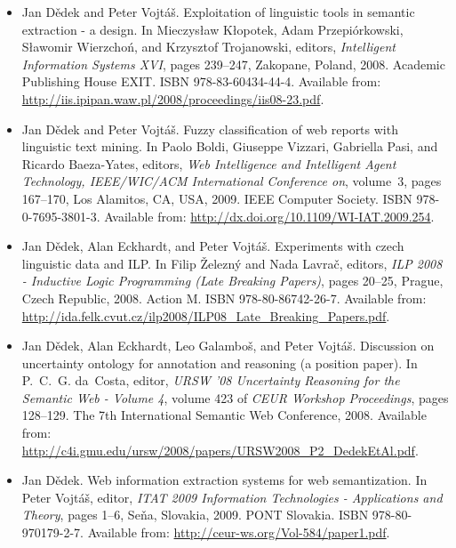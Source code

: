 \documentclass[12pt,a4paper,twoside,notitlepage]{article}
\begin{document}
\begin{itemize}
\item
Jan D{\v{e}}dek and Peter Vojt{\'{a}}{\v{s}}.
\newblock Exploitation of linguistic tools in semantic extraction - a design.
\newblock In Mieczys{{\l}}aw K{{\l}}opotek, Adam Przepi{\'{o}}rkowski,
  S{{\l}}awomir Wierzcho{\'{n}}, and Krzysztof Trojanowski, editors, {\em
  Intelligent Information Systems {XVI}}, pages 239--247, Zakopane, Poland,
  2008. Academic Publishing House {EXIT}.
\newblock ISBN 978-83-60434-44-4.
\newblock Available from:
  \url{http://iis.ipipan.waw.pl/2008/proceedings/iis08-23.pdf}.


\item
Jan D{\v{e}}dek and Peter Vojt{\'{a}}{\v{s}}.
\newblock Fuzzy classification of web reports with linguistic text mining.
\newblock In Paolo Boldi, Giuseppe Vizzari, Gabriella Pasi, and Ricardo
  Baeza-Yates, editors, {\em Web Intelligence and Intelligent Agent Technology,
  IEEE/WIC/ACM International Conference on}, volume~3, pages 167--170, Los
  Alamitos, CA, USA, 2009. IEEE Computer Society.
\newblock ISBN 978-0-7695-3801-3.
\newblock Available from: \url{http://dx.doi.org/10.1109/WI-IAT.2009.254}.


\item
Jan D{\v{e}}dek, Alan Eckhardt, and Peter Vojt{\'{a}}{\v{s}}.
\newblock Experiments with czech linguistic data and {ILP}.
\newblock In Filip {\v{Z}}elezn{\'{y}} and Nada Lavra{\v{c}}, editors, {\em
  {ILP} 2008 - Inductive Logic Programming (Late Breaking Papers)}, pages
  20--25, Prague, Czech Republic, 2008. Action M.
\newblock ISBN 978-80-86742-26-7.
\newblock Available from:
  \url{http://ida.felk.cvut.cz/ilp2008/ILP08_Late_Breaking_Papers.pdf}.




\item
Jan D{\v{e}}dek, Alan Eckhardt, Leo Galambo{\v{s}}, and Peter
  Vojt{\'{a}}{\v{s}}.
\newblock Discussion on uncertainty ontology for annotation and reasoning (a
  position paper).
\newblock In P.~C.~G. da~Costa, editor, {\em {URSW} '08 Uncertainty Reasoning
  for the Semantic Web - Volume 4}, volume 423 of {\em {CEUR} Workshop
  Proceedings}, pages 128--129. The 7th International Semantic Web Conference,
  2008.
\newblock Available from:
  \url{http://c4i.gmu.edu/ursw/2008/papers/URSW2008_P2_DedekEtAl.pdf}.


\item
Jan D{\v{e}}dek.
\newblock Web information extraction systems for web semantization.
\newblock In Peter Vojt{\'{a}}{\v{s}}, editor, {\em {ITAT} 2009 Information
  Technologies - Applications and Theory}, pages 1--6, Se{\v{n}}a, Slovakia,
  2009. {PONT} Slovakia.
\newblock ISBN 978-80-970179-2-7.
\newblock Available from: \url{http://ceur-ws.org/Vol-584/paper1.pdf}.



\end{itemize}
\end{document}
